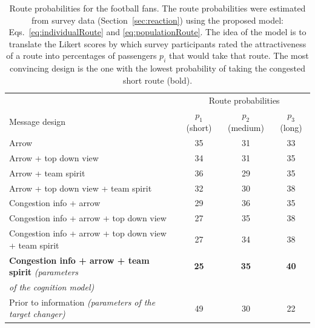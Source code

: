  
\begin{table}[ht!]
\begin{footnotesize}

\begin{tabular}{lccc}
  \hline
  & \multicolumn{3}{c}{Route probabilities}\\ \cline{2-4}
Message design &$p_1$ (short) & $p_2$ (medium) & $p_3$ (long) \\ 
  \hline
     Arrow & 35 & 31 & 33 \\ 
    Arrow + top down view & 34 & 31 & 35 \\
    Arrow + team spirit  & 36 & 29 & 35 \\ 
    Arrow + top down view + team spirit & 32 & 30 & 38 \\
  Congestion info + arrow & 29 & 36 & 35 \\ 
 Congestion info + arrow + top down view & 27 & 35 & 38 \\
 Congestion info + arrow + top down view + team spirit & 27 & 34 & 38 \\ 
   \textbf{Congestion info + arrow + team spirit} \textit{(parameters} &\textbf{25} & \textbf{35} & \textbf{40} \\ 
 \textit{of the cognition model)} &&& \\    
 \cline{1-4}
     Prior to information \textit{(parameters of the target changer)} & 49 & 30 & 22 \\  

\hline
\end{tabular}
\end{footnotesize}
\caption[Route probabilities forfor the survey data]{Route probabilities for the football fans. The route probabilities were estimated from survey data (Section~\ref{sec:reaction}) using the proposed model: Eqs.~\eqref{eq:individualRoute} and \eqref{eq:populationRoute}. The idea of the model is to translate the Likert scores by which survey participants rated the attractiveness of a route 
into percentages of passengers $p_i$ that would take that route. The most convincing design is the one with the lowest probability of taking the congested short route (bold).  }
\label{tab:routechoiceestimates}
\end{table}



